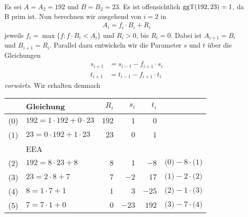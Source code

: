 \begin{beispiel}[EEA]
	Es sei $A = A_2 = 192 $ und $B = B_2 = 23$. Es ist offensichtlich $\operatorname{ggT}(192, 23) = 1$, da B prim ist. Nun berechnen wir ausgehend von $i = 2$ in
	\begin{align*}
		A_i = f_i \cdot B_i + R_i
	\end{align*}
	jeweils $f_i = \max \{f : f \cdot B_i < A_i\}$ und $R_i > 0$, bis $R_i = 0$. Dabei ist $A_{i+1} = B_i$ und $B_{i+1} = R_i$. Parallel dazu entwickeln wir die Parameter $s$ und $t$ über die Gleichungen
	\begin{align*}
		s_{i+1} &= s_{i-1} - f_{i+1} \cdot s_{i}\\
		t_{i+1} &= t_{i-1} - f_{i+1} \cdot t_{i}
	\end{align*}
	\emph{vorwärts}. Wir erhalten demnach
	\begin{table}[h]
		\centering
		\large
		\begin{tabular}[c]{|c|l|rrr|l|}
			\hline
			& Gleichung & $R_i$ & $s_i$ & $t_i$ &\\
			\hline
			\hline
			(0) & $192 = 1 \cdot 192 + 0 \cdot 23$ & $192$ & $1$ & $0$ &\\
			(1) & $23 = 0 \cdot 192 + 1 \cdot 23$ & $23$ & $0$ & $1$ &\\
			\hline 
			& EEA & & & &\\
			\hline
			(2) & $192 = 8 \cdot 23 + 8$ & $8$ & $1$ & $-8$ & $\text{(0)} - 8 \cdot \text{(1)}$\\
			(3) & $23 =  2 \cdot 8 + 7$ & $7$ & $-2$ & $17$ & $\text{(1)} - 2 \cdot \text{(2)}$\\
			(4) & $8 = 1 \cdot 7 + 1$ & $1$ & $3$ & $-25$ & $\text{(2)} - 1 \cdot \text{(3)}$\\ 
			(5) & $7 = 7 \cdot 1 + 0$ & $0$ & $-23$ & $192$ & $\text{(3)} - 7 \cdot \text{(4)}$\\
			\hline
		\end{tabular}
	\end{table}
	

\end{beispiel}
